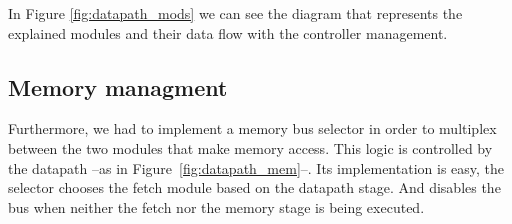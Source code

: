 In Figure \ref{fig:datapath_mods} we can see the diagram that represents the explained modules and
their data flow with the controller management.

\subsection{Memory managment}

Furthermore, we had to implement a memory bus selector
in order to multiplex between the two modules that make memory access. This
logic is controlled by the datapath --as in Figure~\ref{fig:datapath_mem}--.
Its implementation is easy, the selector chooses the fetch module based on the
datapath stage. And disables the bus when neither the fetch nor the memory
stage is being executed.



